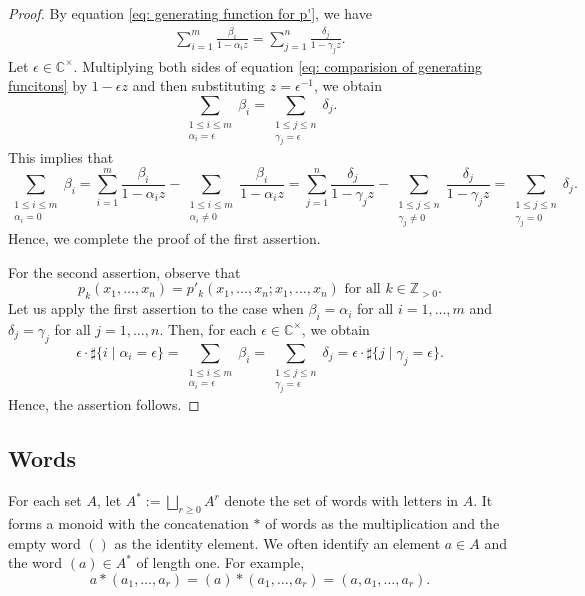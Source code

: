 \documentclass[12pt,a4paper]{amsart}
\theoremstyle{definition}
\numberwithin{equation}{subsection}
\begin{document}
\begin{proof}
  By equation \eqref{eq: generating function for p'}, we have
  \begin{align}\label{eq: comparision of generating funcitons}
    \sum_{i=1}^m \frac{\beta_i}{1-\alpha_iz} = \sum_{j=1}^n \frac{\delta_j}{1-\gamma_jz}.
  \end{align}
  Let $\epsilon \in \mathbb{C}^\times$.
  Multiplying both sides of equation \eqref{eq: comparision of generating funcitons} by $1-\epsilon z$ and then substituting $z = \epsilon^{-1}$, we obtain
  \[
    \sum_{\substack{1 \leq i \leq m\\\alpha_i=\epsilon}} \beta_i = \sum_{\substack{1 \leq j \leq n\\\gamma_j=\epsilon}} \delta_j.
  \]
  This implies that
  \[
    \sum_{\substack{1 \leq i \leq m\\\alpha_i=0}} \beta_i = \sum_{i=1}^m \frac{\beta_i}{1-\alpha_iz} - \sum_{\substack{1 \leq i \leq m\\\alpha_i \neq 0}} \frac{\beta_i}{1-\alpha_iz} = \sum_{j=1}^n \frac{\delta_j}{1-\gamma_jz} - \sum_{\substack{1 \leq j \leq n\\\gamma_j \neq 0}} \frac{\delta_j}{1-\gamma_jz} = \sum_{\substack{1 \leq j \leq n\\\gamma_j=0}} \delta_j.
  \]
  Hence, we complete the proof of the first assertion.

  For the second assertion, observe that
  \[
    p_k(x_1,\dots,x_n) = p'_k(x_1,\dots,x_n;x_1,\dots,x_n) \text{ for all } k \in \mathbb{Z}_{> 0}.
  \]
  Let us apply the first assertion to the case when $\beta_i = \alpha_i$ for all $i = 1,\dots,m$ and $\delta_j = \gamma_j$ for all $j = 1,\dots,n$.
  Then, for each $\epsilon \in \mathbb{C}^\times$, we obtain
  \[
    \epsilon \cdot \sharp\{ i \mid \alpha_i = \epsilon \} = \sum_{\substack{1 \leq i \leq m \\ \alpha_i = \epsilon}} \beta_i = \sum_{\substack{1 \leq j \leq n \\ \gamma_j = \epsilon}} \delta_j = \epsilon \cdot \sharp\{ j \mid \gamma_j = \epsilon \}.
  \]
  Hence, the assertion follows.
\end{proof}


\subsection{Words}
For each set $A$, let $A^* := \bigsqcup_{r \geq 0} A^r$ denote the set of words with letters in $A$.
It forms a monoid with the concatenation $*$ of words as the multiplication and the empty word $()$ as the identity element.
We often identify an element $a \in A$ and the word $(a) \in A^*$ of length one.
For example,
\[
  a*(a_1,\dots,a_r) = (a)*(a_1,\dots,a_r) = (a,a_1,\dots,a_r).
\]
\end{document}
